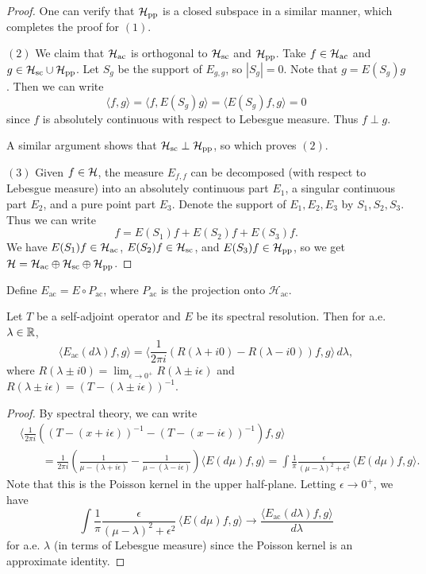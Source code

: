 \begin{proof}
  One can verify that $\mathcal{H}_{\mathrm{pp}}$ is a closed subspace
  in a similar manner, which completes the proof for
  $(1)$.

  $(2)$ We claim that
  $\mathcal{H}_{\mathrm{ac}}$ is orthogonal to $\mathcal{H}_{\mathrm{sc}}$ and $\mathcal{H}_{\mathrm{pp}}$.
  Take $f \in \mathcal{H}_{\mathrm{ac}}$ and $g \in \mathcal{H}_{\mathrm{sc}} \cup \mathcal{H}_{\mathrm{pp}}$.
  Let $S_g$ be the support of $E_{g, g}$, so
  $|S_g| = 0$. Note that $g = E(S_g) g$. Then we can
  write
  \[
    \langle f, g \rangle
    = \langle f, E(S_g) g \rangle
    = \langle E(S_g) f, g \rangle = 0
  \]
  since $f$ is absolutely continuous with respect
  to Lebesgue measure. Thus $f \perp g$.

  A similar argument shows that
  $\mathcal{H}_{\mathrm{sc}} \perp \mathcal{H}_{\mathrm{pp}}$, so which proves $(2)$.

  $(3)$ Given $f \in \mathcal{H}$, the measure $E_{f, f}$ can be
  decomposed (with respect to Lebesgue measure)
  into an absolutely continuous
  part $E_1$, a singular continuous part $E_2$, and
  a pure point part $E_3$. Denote the support of
  $E_1, E_2, E_3$ by $S_1, S_2, S_3$.
  Thus we can write
  \[
    f = E(S_1) f + E(S_2) f + E(S_3) f.
  \]
  We have $E(S_1) f \in \mathcal{H}_{\mathrm{ac}}$, $E(S_2) f \in \mathcal{H}_{\mathrm{sc}}$,
  and $E(S_3) f \in \mathcal{H}_{\mathrm{pp}}$, so we get
  $\mathcal{H} = \mathcal{H}_{\mathrm{ac}} \oplus \mathcal{H}_{\mathrm{sc}} \oplus \mathcal{H}_{\mathrm{pp}}$.
\end{proof}

\begin{definition}
  Define $E_{\mathrm{ac}} = E \circ P_{\mathrm{ac}}$, where
  $P_{\mathrm{ac}}$ is the projection onto
  $\mathcal{H}_{\mathrm{ac}}$.
\end{definition}

\begin{lemma}
  Let $T$ be a self-adjoint operator and $E$ be its
  spectral resolution. Then for a.e. $\lambda \in \mathbb{R}$,
  \[
    \langle E_{\mathrm{ac}}(d\lambda) f, g \rangle
    = \langle \frac{1}{2\pi i} (R(\lambda + i0) - R(\lambda - i0)) f, g \rangle\, d \lambda,
  \]
  where $R(\lambda \pm i0) = \lim_{\epsilon \to 0^+} R(\lambda \pm i\epsilon)$
  and $R(\lambda \pm i \epsilon) = (T - (\lambda \pm i \epsilon))^{-1}$.
\end{lemma}

\begin{proof}
  By spectral theory, we can write
  \begin{align*}
    &\langle \frac{1}{2\pi i} ((T - (x + i\epsilon))^{-1} - (T - (x - i\epsilon))^{-1}) f, g \rangle \\
    & \quad \quad = \frac{1}{2\pi i} \left(\frac{1}{\mu - (\lambda + i\epsilon)} - \frac{1}{\mu - (\lambda - i\epsilon)}\right)
    \langle E(d\mu) f, g \rangle
    = \int \frac{1}{\pi} \frac{\epsilon}{(\mu - \lambda)^2 + \epsilon^2}\,  \langle E(d\mu) f, g \rangle.
  \end{align*}
  Note that this is the Poisson kernel in the
  upper half-plane. Letting $\epsilon \to 0^+$, we have
  \[
    \int \frac{1}{\pi} \frac{\epsilon}{(\mu - \lambda)^2 + \epsilon^2}\,  \langle E(d\mu) f, g \rangle
    \to \frac{\langle E_{\mathrm{ac}}(d\lambda) f, g \rangle}{d\lambda}
  \]
  for a.e. $\lambda$ (in terms of Lebesgue measure)
  since the Poisson kernel is an approximate identity.
\end{proof}

